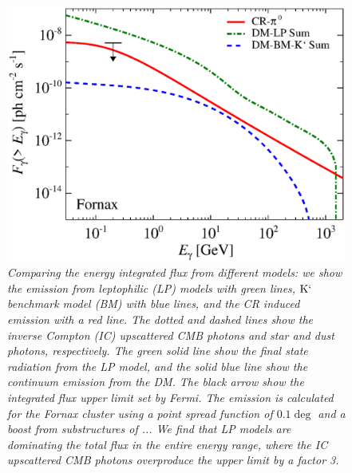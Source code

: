 \documentclass[10pt,aps,pra,reprint,amsmath,amsfonts,amssymb,showpacs]{revtex4-1}
\newcommand{\rmn}{\mathrm}
\newcommand{\Km}{\rmn{K}`}
\begin{document}
\begin{figure}
 \includegraphics[width=0.99\columnwidth]{figures/flux.int.v8.0.1deg.1.6T.SubMass.SF300.IR2.noMW.woGal.eps}
\caption{\it Comparing the energy integrated flux from different
  models: we show the emission from leptophilic (LP) models with green
  lines, $\Km$ benchmark model (BM) with blue lines, and the CR
  induced emission with a red line. The dotted and dashed lines show
  the inverse Compton (IC) upscattered CMB photons and star and dust
  photons, respectively. The green solid line show the final state
  radiation from the LP model, and the solid blue line show the
  continuum emission from the DM. The black arrow show the integrated
  flux upper limit set by Fermi.  The emission is calculated for the
  Fornax cluster using a point spread function of $0.1\deg$ and a
  boost from substructures of ...  We find that LP models are
  dominating the total flux in the entire energy range, where the IC
  upscattered CMB photons overproduce the upper limit by a factor 3.}
 \label{fig8}
\end{figure}
\end{document}

